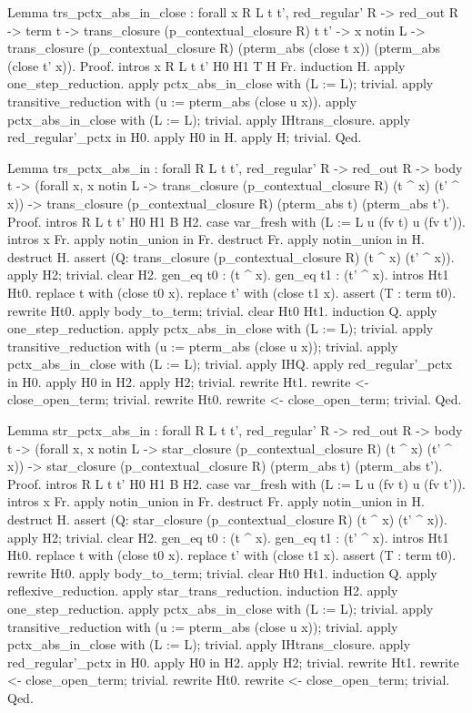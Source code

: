 \documentclass[12pt]{report}
\begin{document}
Lemma trs\_pctx\_abs\_in\_close : forall x R L t t', red\_regular' R -> red\_out R -> term t ->
                         trans\_closure (p\_contextual\_closure R) t t' -> x notin L ->
                         trans\_closure (p\_contextual\_closure R) (pterm\_abs (close t x)) (pterm\_abs (close t' x)).
Proof.
 intros x R L t t' H0 H1 T H Fr. induction H.
 apply one\_step\_reduction. apply pctx\_abs\_in\_close with (L := L); trivial.  
  apply transitive\_reduction with (u := pterm\_abs (close u x)).
 apply pctx\_abs\_in\_close with (L := L); trivial.
 apply IHtrans\_closure. apply red\_regular'\_pctx in H0. 
 apply H0 in H. apply H; trivial.
Qed.


Lemma trs\_pctx\_abs\_in : forall R L t t', red\_regular' R -> red\_out R -> body t ->
                       (forall x, x notin L ->  trans\_closure (p\_contextual\_closure R) (t \^{} x) (t' \^{} x)) ->
                       trans\_closure (p\_contextual\_closure R) (pterm\_abs t) (pterm\_abs t').
Proof.
 intros R L t t' H0 H1 B H2.  case var\_fresh with (L := L u (fv t) u (fv t')). intros x Fr.
 apply notin\_union in Fr. destruct Fr. apply notin\_union in H. destruct H.
 assert (Q: trans\_closure (p\_contextual\_closure R) (t \^{} x) (t' \^{} x)). apply H2; trivial. clear H2.
 gen\_eq t0 : (t \^{} x). gen\_eq t1 : (t' \^{} x). intros Ht1 Ht0.
 replace t with (close t0 x). replace t' with (close t1 x).
 assert (T : term t0). rewrite Ht0. apply body\_to\_term; trivial.
 clear Ht0 Ht1. induction Q.
 apply one\_step\_reduction. apply pctx\_abs\_in\_close with (L := L); trivial.
 apply transitive\_reduction with (u := pterm\_abs (close u x)); trivial.
 apply pctx\_abs\_in\_close with (L := L); trivial. apply IHQ.
 apply red\_regular'\_pctx in H0. apply H0 in H2. apply H2; trivial.
 rewrite Ht1. rewrite <- close\_open\_term; trivial. 
 rewrite Ht0. rewrite <- close\_open\_term; trivial.
Qed.


Lemma str\_pctx\_abs\_in : forall R L t t', red\_regular' R -> red\_out R -> body t ->
                       (forall x, x notin L ->  star\_closure (p\_contextual\_closure R) (t \^{} x) (t' \^{} x)) ->
                       star\_closure (p\_contextual\_closure R) (pterm\_abs t) (pterm\_abs t').
Proof.
 intros R L t t' H0 H1 B H2.  case var\_fresh with (L := L u (fv t) u (fv t')). intros x Fr.
 apply notin\_union in Fr. destruct Fr. apply notin\_union in H. destruct H.
 assert (Q: star\_closure (p\_contextual\_closure R) (t \^{} x) (t' \^{} x)). apply H2; trivial. clear H2.
 gen\_eq t0 : (t \^{} x). gen\_eq t1 : (t' \^{} x). intros Ht1 Ht0.
 replace t with (close t0 x). replace t' with (close t1 x).
 assert (T : term t0). rewrite Ht0. apply body\_to\_term; trivial.
 clear Ht0 Ht1. induction Q.
 apply reflexive\_reduction. apply star\_trans\_reduction. induction H2.
 apply one\_step\_reduction. apply pctx\_abs\_in\_close with (L := L); trivial.
 apply transitive\_reduction with (u := pterm\_abs (close u x)); trivial.
 apply pctx\_abs\_in\_close with (L := L); trivial.
 apply IHtrans\_closure.
 apply red\_regular'\_pctx in H0. apply H0 in H2. apply H2; trivial.
 rewrite Ht1. rewrite <- close\_open\_term; trivial. 
 rewrite Ht0. rewrite <- close\_open\_term; trivial.
Qed.
\end{document}
